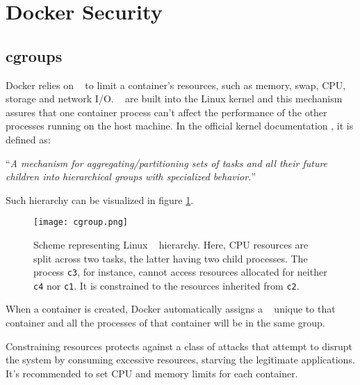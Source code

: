 
\section{Docker Security}
\label{sec::security}

\subsection{cgroups}
\label{ssec::security:cgroups}

Docker relies on \cgroups~ to limit a container's resources, such as memory, swap, \acs{CPU}, storage and network I/O. \cgroups~ are built into the Linux kernel and this mechanism assures that one container process can't affect the performance of the other processes running on the host machine. In the official kernel documentation \cite{cgroup-man}, it is defined as:

\begin{displayquote}
    ``\textit{A mechanism for aggregating/partitioning sets of tasks and all their future children into hierarchical groups with specialized behavior.}''
\end{displayquote}

Such hierarchy can be visualized in figure \ref{fig:cgroup-hch}.

\begin{figure}[!htb]
    \centering
    \texttt{[image: cgroup.png]}
    \caption{Scheme representing Linux \cgroup~ hierarchy\cite{fig-src:cgroups}. Here, \acs{CPU} resources are split across two tasks, the latter having two child processes. The process \texttt{c3}, for instance, cannot access resources allocated for neither \texttt{c4} nor \texttt{c1}. It is constrained to the resources inherited from \texttt{c2}.}
    \label{fig:cgroup-hch}
\end{figure}

When a container is created, Docker automatically assigns a \cgroup~ unique to that container and all the processes of that container will be in the same group\cite{docker-cgroups}.

Constraining resources protects against a class of attacks that attempt to disrupt the system by consuming excessive resources, starving the legitimate applications. It's recommended to set \acs{CPU} and memory limits for each container\cite{Rice2020-kl}.


